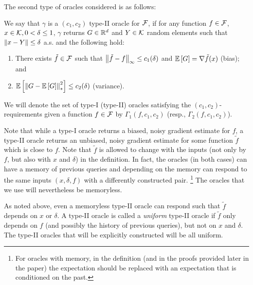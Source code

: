 The second type of oracles considered is as follows: 
\begin{definition}
\label{def:oracle2}
We say that $\gamma$ is a  $(c_1,c_2)$ type-II oracle for $\mathcal{F}$, if for any function $f\in \mathcal{F}$,
$x\in \mathcal{K},0<\delta\le 1$, $\gamma$ returns $G\in \mathbb{R}^d$ and  $Y\in \mathcal{K}$ random elements such that $\left\|x-Y\right\|\le \delta$ a.s. and the following hold:
\begin{enumerate}
\item There exists $\tilde{f} \in \mathcal{F}$ such that
$\big\|\tilde{f}- f\big\|_\infty \le c_1(\delta)$  and
$\mathbb{E}\left[G\right]  = \nabla \tilde{f}(x)$ (bias); and
\item $\mathbb{E}\left[\left\| G -  \mathbb{E}\left[G\right] \right\|_*^2\right] \le c_2(\delta)$ (variance).
\end{enumerate}
\end{definition}
We will denote the set of type-I (type-II) oracles satisfying the $(c_1,c_2)$-requirements given a function $f\in \mathcal{F}$ by $\Gamma_1(f,c_1,c_2)$ (resp., $\Gamma_2(f,c_1,c_2)$).

Note that while a type-I oracle returns a biased, noisy gradient estimate for $f$, 
a type-II oracle returns an unbiased, noisy gradient estimate for some function $\tilde{f}$ which is close to $f$.
Note that $\tilde{f}$ is allowed to change with the inputs (not only by $f$, but also with $x$ and $\delta$) in the definition.
In fact, the oracles (in both cases)  can have a memory of previous queries and depending on the memory
can respond to the same inputs $(x,\delta,f)$ with a differently constructed pair.%
\footnote{For oracles with memory, in the definition (and in the proofs provided later in the paper) the expectation should be replaced with
an expectation that is conditioned on the past.}
The oracles that we use will nevertheless be memoryless.

As noted above, even a memoryless type-II oracle can respond such that $\tilde{f}$ depends on $x$ or $\delta$.
A type-II oracle is called a \emph{uniform} type-II oracle if $\tilde{f}$ only depends on $f$ (and possibly the history of previous queries), but not on $x$ and $\delta$.
The type-II oracles that will be explicitly constructed will be all uniform.
%

